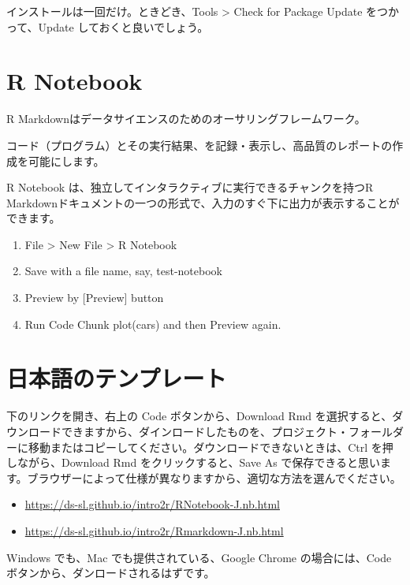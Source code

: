 \documentclass[
  xelatex, ja=standard]{bxjsbook}
\providecommand{\tightlist}{%
  \setlength{\itemsep}{0pt}\setlength{\parskip}{0pt}}
\theoremstyle{definition}
\theoremstyle{definition}
\theoremstyle{definition}
\theoremstyle{definition}
\theoremstyle{remark}
\begin{document}
インストールは一回だけ。ときどき、Tools \textgreater{} Check for Package Update をつかって、Update しておくと良いでしょう。

\hypertarget{r-notebook}{%
\section{R Notebook}\label{r-notebook}}

R Markdownはデータサイエンスのためのオーサリングフレームワーク。

コード（プログラム）とその実行結果、を記録・表示し、高品質のレポートの作成を可能にします。

R Notebook は、独立してインタラクティブに実行できるチャンクを持つR Markdownドキュメントの一つの形式で、入力のすぐ下に出力が表示することができます。

\begin{enumerate}
\def\labelenumi{\arabic{enumi}.}
\tightlist
\item
  File \textgreater{} New File \textgreater{} R Notebook
\item
  Save with a file name, say, test-notebook
\item
  Preview by {[}Preview{]} button
\item
  Run Code Chunk plot(cars) and then Preview again.
\end{enumerate}

\hypertarget{ux65e5ux672cux8a9eux306eux30c6ux30f3ux30d7ux30ecux30fcux30c8}{%
\section{日本語のテンプレート}\label{ux65e5ux672cux8a9eux306eux30c6ux30f3ux30d7ux30ecux30fcux30c8}}

下のリンクを開き、右上の Code ボタンから、Download Rmd を選択すると、ダウンロードできますから、ダインロードしたものを、プロジェクト・フォールダーに移動またはコピーしてください。ダウンロードできないときは、Ctrl を押しながら、Download Rmd をクリックすると、Save As で保存できると思います。ブラウザーによって仕様が異なりますから、適切な方法を選んでください。

\begin{itemize}
\tightlist
\item
  \url{https://ds-sl.github.io/intro2r/RNotebook-J.nb.html}
\item
  \url{https://ds-sl.github.io/intro2r/Rmarkdown-J.nb.html}
\end{itemize}

Windows でも、Mac でも提供されている、Google Chrome の場合には、Code ボタンから、ダンロードされるはずです。
\end{document}
